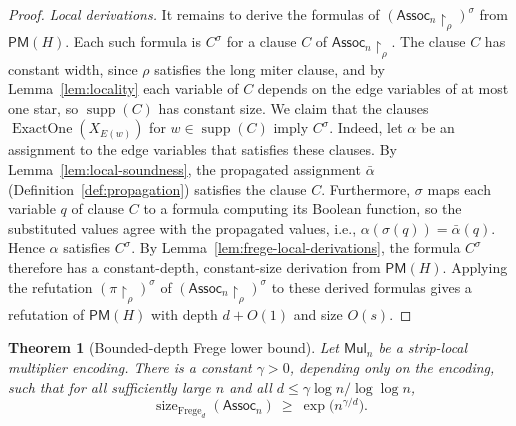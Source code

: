 \documentclass[11pt]{article}
\newtheorem{theorem}{Theorem}[section]
\theoremstyle{definition}
\theoremstyle{remark}
\newcommand{\Assoc}{\mathsf{Assoc}}
\newcommand{\Mul}{\mathsf{Mul}}
\newcommand{\PM}{\mathsf{PM}}
\newcommand{\sizeF}[1]{\operatorname{size}_{\mathrm{Frege}_{#1}}}
\newcommand{\supp}{\operatorname{supp}}
\begin{document}
\begin{proof}
\emph{Local derivations.} 
It remains to derive the formulas of $(\Assoc_n\!\upharpoonright_\rho)^\sigma$ from $\PM(H)$. Each such formula is $C^\sigma$ for a clause $C$ of $\Assoc_n\!\upharpoonright_\rho$. The clause $C$ has constant width, since $\rho$ satisfies the long miter clause, and by Lemma~\ref{lem:locality} each variable of $C$ depends on the edge variables of at most one star, so $\supp(C)$ has constant size. We claim that the clauses $\operatorname{ExactOne}(X_{E(w)})$ for $w\in\supp(C)$ imply $C^\sigma$. Indeed, let $\alpha$ be an assignment to the edge variables that satisfies these clauses. By Lemma~\ref{lem:local-soundness}, the propagated assignment $\bar\alpha$ (Definition~\ref{def:propagation}) satisfies the clause $C$. Furthermore, $\sigma$ maps each variable $q$ of clause $C$ to a formula computing its Boolean function, so the substituted values agree with the propagated values, i.e., $\alpha(\sigma(q))=\bar\alpha(q)$. Hence $\alpha$ satisfies $C^\sigma$. By Lemma~\ref{lem:frege-local-derivations}, the formula $C^\sigma$ therefore has a constant-depth, constant-size derivation from $\PM(H)$. Applying the refutation $(\pi\!\upharpoonright_\rho)^\sigma$ of $(\Assoc_n\!\upharpoonright_\rho)^\sigma$ to these derived formulas gives a refutation of $\PM(H)$ with depth $d+O(1)$ and size $O(s)$.
\end{proof}

\begin{theorem}[Bounded-depth Frege lower bound]
\label{thm:frege}
Let $\Mul_n$ be a strip-local multiplier encoding. There is a constant $\gamma>0$, depending only on the encoding, such that for all sufficiently large $n$ and all $d\le\gamma\log n/\log\log n$,
\[
\sizeF{d}(\Assoc_n)\ \ge\ \exp\bigl(n^{\gamma/d}\bigr).
\]
\end{theorem}
\end{document}
